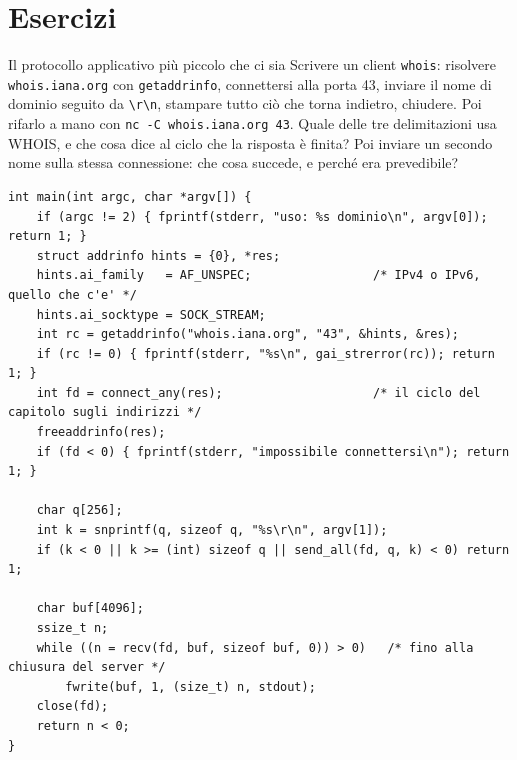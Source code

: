 
\section{Esercizi}

\begin{esercizio}{Il protocollo applicativo più piccolo che ci sia}
Scrivere un client \texttt{whois}: risolvere \texttt{whois.iana.org} con \texttt{getaddrinfo}, connettersi alla porta 43,
inviare il nome di dominio seguito da \texttt{\textbackslash r\textbackslash n}, stampare tutto ciò che torna indietro,
chiudere. Poi rifarlo a mano con \texttt{nc -C whois.iana.org 43}. Quale delle tre delimitazioni usa WHOIS, e che cosa
dice al ciclo che la risposta è finita? Poi inviare un secondo nome sulla stessa connessione: che cosa succede, e perché
era prevedibile?

\svolgimento
\begin{lstlisting}[language={[POSIX]C}, style=wnumbers, title={whois.c}]
int main(int argc, char *argv[]) {
    if (argc != 2) { fprintf(stderr, "uso: %s dominio\n", argv[0]); return 1; }
    struct addrinfo hints = {0}, *res;
    hints.ai_family   = AF_UNSPEC;                 /* IPv4 o IPv6, quello che c'e' */
    hints.ai_socktype = SOCK_STREAM;
    int rc = getaddrinfo("whois.iana.org", "43", &hints, &res);
    if (rc != 0) { fprintf(stderr, "%s\n", gai_strerror(rc)); return 1; }
    int fd = connect_any(res);                     /* il ciclo del capitolo sugli indirizzi */
    freeaddrinfo(res);
    if (fd < 0) { fprintf(stderr, "impossibile connettersi\n"); return 1; }

    char q[256];
    int k = snprintf(q, sizeof q, "%s\r\n", argv[1]);
    if (k < 0 || k >= (int) sizeof q || send_all(fd, q, k) < 0) return 1;

    char buf[4096];
    ssize_t n;
    while ((n = recv(fd, buf, sizeof buf, 0)) > 0)   /* fino alla chiusura del server */
        fwrite(buf, 1, (size_t) n, stdout);
    close(fd);
    return n < 0;
}
\end{lstlisting}


\end{esercizio}
